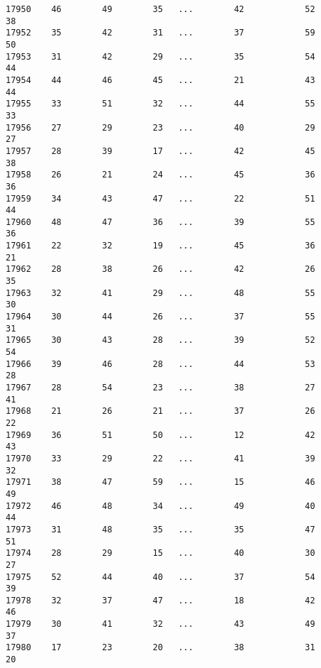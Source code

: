 \documentclass[11pt]{article}
\begin{document}
\begin{verbatim}
17950    46        49        35   ...        42            52          38   
17952    35        42        31   ...        37            59          50   
17953    31        42        29   ...        35            54          44   
17954    44        46        45   ...        21            43          44   
17955    33        51        32   ...        44            55          33   
17956    27        29        23   ...        40            29          27   
17957    28        39        17   ...        42            45          38   
17958    26        21        24   ...        45            36          36   
17959    34        43        47   ...        22            51          44   
17960    48        47        36   ...        39            55          36   
17961    22        32        19   ...        45            36          21   
17962    28        38        26   ...        42            26          35   
17963    32        41        29   ...        48            55          30   
17964    30        44        26   ...        37            55          31   
17965    30        43        28   ...        39            52          54   
17966    39        46        28   ...        44            53          28   
17967    28        54        23   ...        38            27          41   
17968    21        26        21   ...        37            26          22   
17969    36        51        50   ...        12            42          43   
17970    33        29        22   ...        41            39          32   
17971    38        47        59   ...        15            46          49   
17972    46        48        34   ...        49            40          44   
17973    31        48        35   ...        35            47          51   
17974    28        29        15   ...        40            30          27   
17975    52        44        40   ...        37            54          39   
17978    32        37        47   ...        18            42          46   
17979    30        41        32   ...        43            49          37   
17980    17        23        20   ...        38            31          20   


\end{verbatim}
\end{document}
